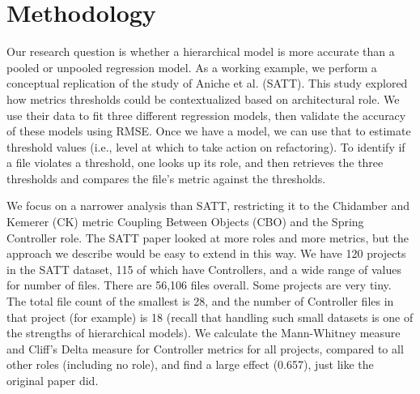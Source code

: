 \documentclass[sigconf,natbib=false]{acmart}
\begin{document}



\section{Methodology}
Our research question is whether a hierarchical model is more accurate than a pooled or unpooled regression model. As a working example, we perform a conceptual replication of the study of Aniche et al. \cite{Aniche2016} (SATT). This study explored how metrics thresholds could be contextualized based on architectural role. We use their data to fit three different regression models, then validate the accuracy of these models using RMSE. Once we have a model, we can use that to estimate threshold values (i.e., level at which to take action on refactoring). To identify if a file violates a threshold, one looks up its role, and then retrieves the three thresholds and compares the file's metric against the thresholds.

We focus on a narrower analysis than SATT, restricting it to the Chidamber and Kemerer (CK) metric Coupling Between Objects (CBO) \cite{Chidamber_1991} and the Spring Controller role. The SATT paper looked at more roles and more metrics, but the approach we describe would be easy to extend in this way. We have 120 projects in the SATT dataset, 115 of which have Controllers, and a wide range of values for number of files. There are 56,106 files overall. Some projects are very tiny. The total file count of the smallest is 28, and the number of Controller files in that project (for example) is 18 (recall that handling such small datasets is one of the strengths of hierarchical models). We calculate the Mann-Whitney measure and Cliff's Delta measure for Controller metrics for all projects, compared to all other roles (including no role), and find a large effect (0.657), just like the original paper did. 
\end{document}
